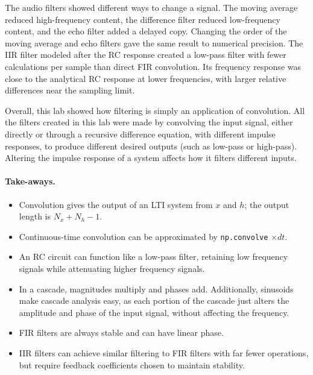 \documentclass[11pt]{article}
\begin{document}
The audio filters showed different ways to change a signal. The moving average reduced high-frequency content, the difference filter reduced low-frequency content, and the echo filter added a delayed copy. Changing the order of the moving average and echo filters gave the same result to numerical precision. The IIR filter modeled after the RC response created a low-pass filter with fewer calculations per sample than direct FIR convolution. Its frequency response was close to the analytical RC response at lower frequencies, with larger relative differences near the sampling limit.

Overall, this lab showed how filtering is simply an application of convolution. All the filters created in this lab were made by convolving the input signal, either directly or through a recursive difference equation, with different impulse responses, to produce different desired outputs (such as low-pass or high-pass). Altering the impulse response of a system affects how it filters different inputs. 

\paragraph{Take-aways.}

\begin{itemize}
  \item Convolution gives the output of an LTI system from $x$ and $h$; the output length is $N_x+N_h-1$.
  \item Continuous-time convolution can be approximated by \texttt{np.convolve} $\times dt$.
  \item An RC circuit can function like a low-pass filter, retaining low frequency signals while attenuating higher frequency signals.
  \item In a cascade, magnitudes multiply and phases add. Additionally, sinusoids make cascade analysis easy, as each portion of the cascade just alters the amplitude and phase of the input signal, without affecting the frequency. 
  \item FIR filters are always stable and can have linear phase.
  \item IIR filters can achieve similar filtering to FIR filters with far fewer operations, but require feedback coefficients chosen to maintain stability.
\end{itemize}
\end{document}
